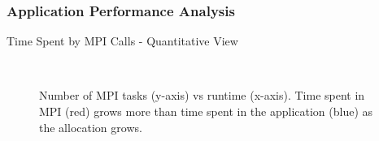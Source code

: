 \documentclass{beamer}
\begin{document}
\begin{frame}[fragile]
  \frametitle{Application Performance Analysis}
\begin{block}{Time Spent by MPI Calls - Quantitative View}
\vspace*{-0.5cm}
\begin{figure}
\\ 
\vspace*{-0.2cm}
\vspace*{-0.2cm}
\caption{Number of MPI tasks (y-axis) vs runtime (x-axis). Time spent in MPI (red) grows more than time spent in the application (blue) as the allocation grows.}
\end{figure}
\end{block}
\end{frame} 
\end{document}
